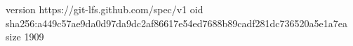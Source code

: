 version https://git-lfs.github.com/spec/v1
oid sha256:a449c57ae9da0d97da9dc2af86617e54ed7688b89cadf281dc736520a5e1a7ea
size 1909
